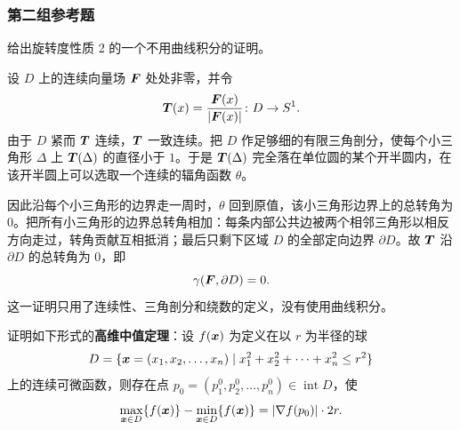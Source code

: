\subsubsection*{第二组参考题}

\begin{xreferenceproblem}[1]
给出旋转度性质 2 的一个不用曲线积分的证明。
\end{xreferenceproblem}
\begin{xsolution}
设 $D$ 上的连续向量场 $\bm{F}$ 处处非零，并令
\[
  \bm{T}(x)=\frac{\bm{F}(x)}{\lvert\bm{F}(x)\rvert}\colon D\to S^1.
\]
由于 $D$ 紧而 $\bm{T}$ 连续，$\bm{T}$ 一致连续。把 $D$ 作足够细的有限三角剖分，使每个小三角形 $\Delta$ 上 $\bm{T}(\Delta)$ 的直径小于 $1$。于是 $\bm{T}(\Delta)$ 完全落在单位圆的某个开半圆内，在该开半圆上可以选取一个连续的辐角函数 $\theta$。

因此沿每个小三角形的边界走一周时，$\theta$ 回到原值，该小三角形边界上的总转角为 $0$。把所有小三角形的边界总转角相加：每条内部公共边被两个相邻三角形以相反方向走过，转角贡献互相抵消；最后只剩下区域 $D$ 的全部定向边界 $\partial D$。故 $\bm{T}$ 沿 $\partial D$ 的总转角为 $0$，即
\[
  \gamma(\bm{F},\partial D)=0.
\]
这一证明只用了连续性、三角剖分和绕数的定义，没有使用曲线积分。
\end{xsolution}
\begin{xreferenceproblem}[2]
证明如下形式的\textbf{高维中值定理}：设 $f(\bm{x})$ 为定义在以 $r$ 为半径的球
\[
  D=\{\bm{x}=(x_1,x_2,\ldots,x_n)\mid x_1^2+x_2^2+\cdots+x_n^2\le r^2\}
\]
上的连续可微函数，则存在点 $p_0=(p_1^0,p_2^0,\ldots,p_n^0)\in\operatorname{int}D$，使
\[
  \max_{\bm{x}\in D}\{f(\bm{x})\}-\min_{\bm{x}\in D}\{f(\bm{x})\}=\lvert\nabla f(p_0)\rvert\cdot2r.
\]
\end{xreferenceproblem}
